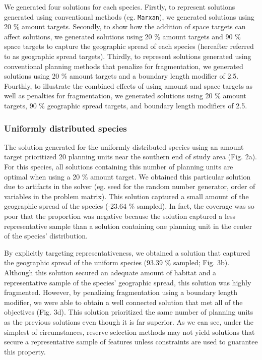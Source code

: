 We generated four solutions for each species. Firstly, to represent
solutions generated using conventional methods (eg. \texttt{Marxan}), we
generated solutions using 20 \% amount targets. Secondly, to show how
the addition of space targets can affect solutions, we generated
solutions using 20 \% amount targets and 90 \% space targets to capture
the geographic spread of each species (hereafter referred to as
geographic spread targets). Thirdly, to represent solutions generated
using conventional planning methods that penalize for fragmentation, we
generated solutions using 20 \% amount targets and a boundary length
modifier of 2.5. Fourthly, to illustrate the combined effects of using
amount and space targets as well as penalties for fragmentation, we
generated solutions using 20 \% amount targets, 90 \% geographic spread
targets, and boundary length modifiers of 2.5.

\subsubsection{Uniformly distributed
species}\label{uniformly-distributed-species}

The solution generated for the uniformly distributed species using an
amount target prioritized 20 planning units near the southern end of
study area (Fig. 2a). For this species, all solutions containing this
number of planning units are optimal when using a 20 \% amount target.
We obtained this particular solution due to artifacts in the solver (eg.
seed for the random number generator, order of variables in the problem
matrix). This solution captured a small amount of the geographic spread
of the species (-23.64 \% sampled). In fact, the coverage was so poor
that the proportion was negative because the solution captured a less
representative sample than a solution containing one planning unit in
the center of the species' distribution.

By explicitly targeting representativeness, we obtained a solution that
captured the geographic spread of the uniform species (93.39 \% sampled;
Fig. 3b). Although this solution secured an adequate amount of habitat
and a representative sample of the species' geographic spread, this
solution was highly fragmented. However, by penalizing fragmentation
using a boundary length modifier, we were able to obtain a well
connected solution that met all of the objectives (Fig. 3d). This
solution prioritized the same number of planning units as the previous
solutions even though it is far superior. As we can see, under the
simplest of circumstances, reserve selection methods may not yield
solutions that secure a representative sample of features unless
constraints are used to guarantee this property.

